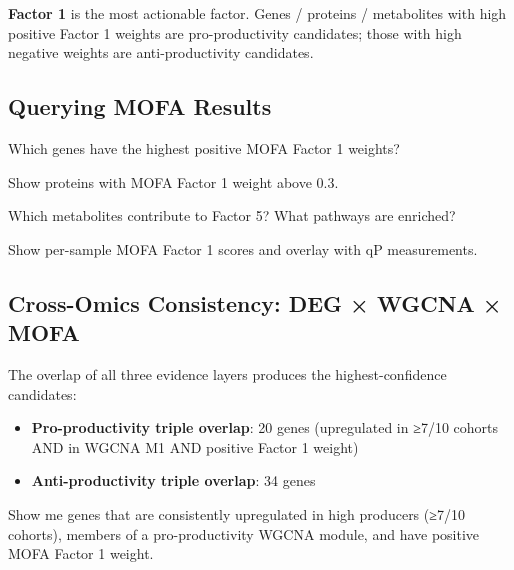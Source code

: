 \documentclass[
  letterpaper,
  oneside,
  open=any]{scrbook}
\providecommand{\tightlist}{%
  \setlength{\itemsep}{0pt}\setlength{\parskip}{0pt}}
\begin{document}
\begin{tcolorbox}[enhanced jigsaw, arc=.35mm, bottomrule=.15mm, bottomtitle=1mm, breakable, colback=white, colbacktitle=quarto-callout-important-color!10!white, colframe=quarto-callout-important-color-frame, coltitle=black, left=2mm, leftrule=.75mm, opacityback=0, opacitybacktitle=0.6, rightrule=.15mm, title=\textcolor{quarto-callout-important-color}{\faExclamation}\hspace{0.5em}{Important}, titlerule=0mm, toprule=.15mm, toptitle=1mm]

\textbf{Factor 1} is the most actionable factor. Genes / proteins /
metabolites with high positive Factor 1 weights are pro-productivity
candidates; those with high negative weights are anti-productivity
candidates.

\end{tcolorbox}

\subsection{Querying MOFA Results}\label{querying-mofa-results}

Which genes have the highest positive MOFA Factor 1 weights?

Show proteins with MOFA Factor 1 weight above 0.3.

Which metabolites contribute to Factor 5? What pathways are enriched?

Show per-sample MOFA Factor 1 scores and overlay with qP measurements.

\subsection{Cross-Omics Consistency: DEG × WGCNA ×
MOFA}\label{cross-omics-consistency-deg-wgcna-mofa}

The overlap of all three evidence layers produces the highest-confidence
candidates:

\begin{itemize}
\tightlist
\item
  \textbf{Pro-productivity triple overlap}: 20 genes (upregulated in
  ≥7/10 cohorts AND in WGCNA M1 AND positive Factor 1 weight)
\item
  \textbf{Anti-productivity triple overlap}: 34 genes
\end{itemize}

Show me genes that are consistently upregulated in high producers (≥7/10
cohorts), members of a pro-productivity WGCNA module, and have positive
MOFA Factor 1 weight.
\end{document}
